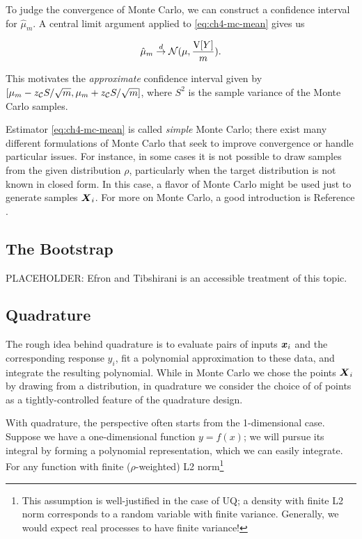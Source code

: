 \documentclass[../primer.tex]{subfiles}
\begin{document}
To judge the convergence of Monte Carlo, we can construct a confidence interval
for $\hat{\mu}_m$. A central limit argument applied to \eqref{eq:ch4-mc-mean}
gives us

\begin{equation} \label{eq:ch4-mc-clt}
  \hat{\mu}_m \stackrel{d}{\to} \mathcal{N}(\mu, \frac{\mathrm{V}[Y]}{m}).
\end{equation}

\noindent This motivates the \emph{approximate} confidence interval given by
$[\mu_m - z_{\mathcal{C}} S / \sqrt{m}, \mu_m + z_{\mathcal{C}} S / \sqrt{m}]$, where $S^2$ is
the sample variance of the Monte Carlo samples.

Estimator \ref{eq:ch4-mc-mean} is called \emph{simple} Monte Carlo; there exist
many different formulations of Monte Carlo that seek to improve convergence or
handle particular issues. For instance, in some cases it is not possible to draw
samples from the given distribution $\rho$, particularly when the target
distribution is not known in closed form. In this case, a flavor of Monte Carlo
might be used just to generate samples $\boldsymbol{X}_i$. For more on Monte Carlo, a good
introduction is Reference \cite{owen2013montecarlo}.

\subsection{The Bootstrap}


PLACEHOLDER: Efron and Tibshirani\cite{efron1986} is an accessible treatment of
this topic.

\subsection{Quadrature}
The rough idea behind quadrature is to evaluate pairs of inputs $\boldsymbol{x}_i$ and the
corresponding response $y_i$, fit a polynomial approximation to these data, and
integrate the resulting polynomial. While in Monte Carlo we chose the points
$\boldsymbol{X}_i$ by drawing from a distribution, in quadrature we consider the choice of
of points as a tightly-controlled feature of the quadrature design.

With quadrature, the perspective often starts from the 1-dimensional case.
Suppose we have a one-dimensional function $y = f(x)$; we will pursue its
integral by forming a polynomial representation, which we can easily integrate.
For any function with finite ($\rho$-weighted) L2 norm\footnote{This assumption
  is well-justified in the case of UQ; a density with finite L2 norm corresponds
  to a random variable with finite variance. Generally, we would expect real
  processes to have finite variance!}
\end{document}
